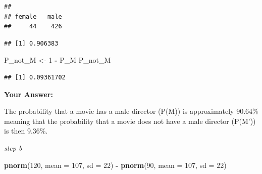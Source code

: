 \documentclass[
]{article}
\newenvironment{Shaded}{\begin{snugshade}}{\end{snugshade}}
\newcommand{\AttributeTok}[1]{\textcolor[rgb]{0.13,0.29,0.53}{#1}}
\newcommand{\ConstantTok}[1]{\textcolor[rgb]{0.56,0.35,0.01}{#1}}
\newcommand{\DecValTok}[1]{\textcolor[rgb]{0.00,0.00,0.81}{#1}}
\newcommand{\FunctionTok}[1]{\textcolor[rgb]{0.13,0.29,0.53}{\textbf{#1}}}
\newcommand{\NormalTok}[1]{#1}
\newcommand{\OtherTok}[1]{\textcolor[rgb]{0.56,0.35,0.01}{#1}}
\newcommand{\SpecialCharTok}[1]{\textcolor[rgb]{0.81,0.36,0.00}{\textbf{#1}}}
\newcommand{\StringTok}[1]{\textcolor[rgb]{0.31,0.60,0.02}{#1}}
\begin{document}
\begin{Shaded}
\end{Shaded}

\begin{verbatim}
## 
## female   male 
##     44    426
\end{verbatim}

\begin{Shaded}
\end{Shaded}

\begin{verbatim}
## [1] 0.906383
\end{verbatim}

\begin{Shaded}
\begin{Highlighting}[]
\NormalTok{P\_not\_M }\OtherTok{\textless{}{-}} \DecValTok{1} \SpecialCharTok{{-}}\NormalTok{ P\_M}
\NormalTok{P\_not\_M}
\end{Highlighting}
\end{Shaded}

\begin{verbatim}
## [1] 0.09361702
\end{verbatim}

\textbf{Your Answer:}

The probability that a movie has a male director (P(M)) is approximately
90.64\% meaning that the probability that a movie does not have a male
director (P(M')) is then 9.36\%.

\emph{step b}

\begin{Shaded}
\begin{Highlighting}[]
\FunctionTok{pnorm}\NormalTok{(}\DecValTok{120}\NormalTok{, }\AttributeTok{mean =} \DecValTok{107}\NormalTok{, }\AttributeTok{sd =} \DecValTok{22}\NormalTok{) }\SpecialCharTok{{-}}
  \FunctionTok{pnorm}\NormalTok{(}\DecValTok{90}\NormalTok{, }\AttributeTok{mean =} \DecValTok{107}\NormalTok{, }\AttributeTok{sd =} \DecValTok{22}\NormalTok{)}
\end{Highlighting}
\end{Shaded}
\end{document}
